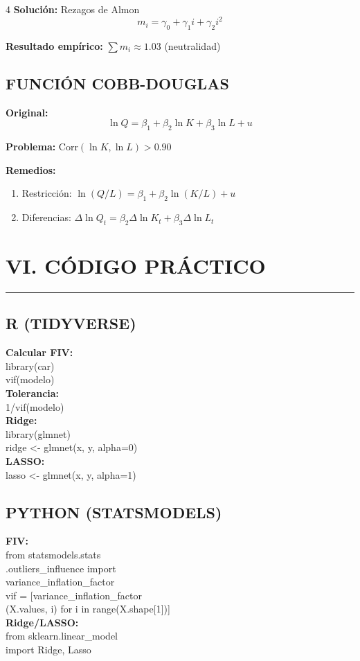 \documentclass[6pt, landscape]{extarticle}
\newcommand{\sectionline}{%
  \nopagebreak\vspace{-4pt}\noindent\textcolor{GoldLeaf}{\rule{\linewidth}{1pt}}\par\vspace{2pt}%
}
\begin{document}
\begin{multicols*}{4}
\textbf{Solución:} Rezagos de Almon
$$m_i = \gamma_0 + \gamma_1 i + \gamma_2 i^2$$

\textbf{Resultado empírico:} $\sum m_i \approx 1.03$ (neutralidad)

\subsection{FUNCIÓN COBB-DOUGLAS}

\textbf{Original:}
$$\ln Q = \beta_1 + \beta_2 \ln K + \beta_3 \ln L + u$$

\textbf{Problema:} $\text{Corr}(\ln K, \ln L) > 0.90$

\textbf{Remedios:}
\begin{enumerate}
    \item Restricción: $\ln(Q/L) = \beta_1 + \beta_2 \ln(K/L) + u$
    \item Diferencias: $\Delta \ln Q_t = \beta_2 \Delta \ln K_t + \beta_3 \Delta \ln L_t$
\end{enumerate}

\section{VI. CÓDIGO PRÁCTICO}
\sectionline

\subsection{R (TIDYVERSE)}

{\scriptsize\ttfamily
\textbf{Calcular FIV:}\\
library(car)\\
vif(modelo)\\[3pt]
\textbf{Tolerancia:}\\
1/vif(modelo)\\[3pt]
\textbf{Ridge:}\\
library(glmnet)\\
ridge <- glmnet(x, y, alpha=0)\\[3pt]
\textbf{LASSO:}\\
lasso <- glmnet(x, y, alpha=1)
}

\subsection{PYTHON (STATSMODELS)}

{\scriptsize\ttfamily
\textbf{FIV:}\\
from statsmodels.stats\\
.outliers\_influence import\\
variance\_inflation\_factor\\[3pt]
vif = [variance\_inflation\_factor\\
(X.values, i) for i in range(X.shape[1])]\\[3pt]
\textbf{Ridge/LASSO:}\\
from sklearn.linear\_model\\
import Ridge, Lasso
}


\end{multicols*}
\end{document}
